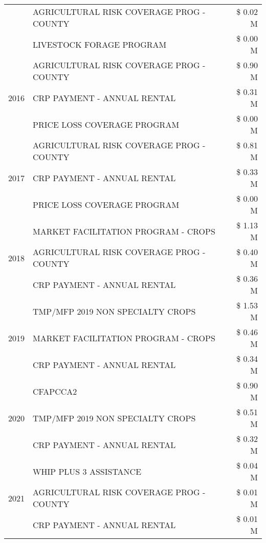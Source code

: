 \begin{tabular}{llr}
 & AGRICULTURAL RISK COVERAGE PROG - COUNTY & \$ 0.02 M \\
 & LIVESTOCK FORAGE PROGRAM & \$ 0.00 M \\
\cline{1-3}
\multirow[t]{3}{*}{2016} & AGRICULTURAL RISK COVERAGE PROG - COUNTY      & \$ 0.90 M \\
 & CRP PAYMENT - ANNUAL RENTAL                   & \$ 0.31 M \\
 & PRICE LOSS COVERAGE PROGRAM                   & \$ 0.00 M \\
\cline{1-3}
\multirow[t]{3}{*}{2017} & AGRICULTURAL RISK COVERAGE PROG - COUNTY & \$ 0.81 M \\
 & CRP PAYMENT - ANNUAL RENTAL & \$ 0.33 M \\
 & PRICE LOSS COVERAGE PROGRAM & \$ 0.00 M \\
\cline{1-3}
\multirow[t]{3}{*}{2018} & MARKET FACILITATION PROGRAM - CROPS & \$ 1.13 M \\
 & AGRICULTURAL RISK COVERAGE PROG - COUNTY & \$ 0.40 M \\
 & CRP PAYMENT - ANNUAL RENTAL & \$ 0.36 M \\
\cline{1-3}
\multirow[t]{3}{*}{2019} & TMP/MFP 2019 NON SPECIALTY CROPS & \$ 1.53 M \\
 & MARKET FACILITATION PROGRAM - CROPS & \$ 0.46 M \\
 & CRP PAYMENT - ANNUAL RENTAL & \$ 0.34 M \\
\cline{1-3}
\multirow[t]{3}{*}{2020} & CFAPCCA2 & \$ 0.90 M \\
 & TMP/MFP 2019 NON SPECIALTY CROPS & \$ 0.51 M \\
 & CRP PAYMENT - ANNUAL RENTAL & \$ 0.32 M \\
\cline{1-3}
\multirow[t]{3}{*}{2021} & WHIP PLUS 3 ASSISTANCE & \$ 0.04 M \\
 & AGRICULTURAL RISK COVERAGE PROG - COUNTY & \$ 0.01 M \\
 & CRP PAYMENT - ANNUAL RENTAL & \$ 0.01 M \\
\cline{1-3}
\bottomrule
\end{tabular}
